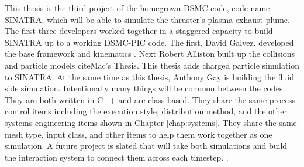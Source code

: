\indent This thesis is the third project of the homegrown DSMC code, code name SINATRA, which will be able to simulate the thruster’s plasma exhaust plume. The first three developers worked together in a staggered capacity to build SINATRA up to a working DSMC-PIC code. The first, David Galvez, developed the base framework and kinematics \cite{Galvez2018a}. Next Robert Alliston built up the collisions and particle models cite{Mac’s Thesis}. This thesis adds charged particle simulation to SINATRA. At the same time as this thesis, Anthony Gay is building the fluid side simulation. Intentionally many things will be common between the codes. They are both written in C++ and are class based. They share the same process control items including the execution style, distribution method, and the other systems engineering items shown in Chapter \ref{chap:systems}. They share the same mesh type, input class, and other items to help them work together as one simulation. A future project is slated that will take both simulations and build the interaction system to connect them across each timestep.
. 
